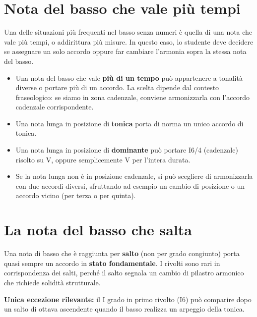\section{Nota del basso che vale più tempi}
\label{sec:nota_piu_tempi}

Una delle situazioni più frequenti nel basso senza numeri è quella di una nota che vale più tempi, o addirittura più misure. In questo caso, lo studente deve decidere se assegnare un solo accordo oppure far cambiare l'armonia sopra la stessa nota del basso.

\begin{regola}
	\label{reg:nota_piu_tempi}
	\begin{itemize}
		\item Una nota del basso che vale \textbf{più di un tempo} può appartenere a tonalità diverse o portare più di un accordo. La scelta dipende dal contesto fraseologico: se siamo in zona cadenzale, conviene armonizzarla con l'accordo cadenzale corrispondente.
		\item Una nota lunga in posizione di \textbf{tonica} porta di norma un unico accordo di tonica.
		\item Una nota lunga in posizione di \textbf{dominante} può portare I6/4 (cadenzale) risolto su V, oppure semplicemente V per l'intera durata.
		\item Se la nota lunga non è in posizione cadenzale, si può scegliere di armonizzarla con due accordi diversi, sfruttando ad esempio un cambio di posizione o un accordo vicino (per terza o per quinta).
	\end{itemize}
\end{regola}

\section{La nota del basso che salta}
\label{sec:nota_salta}

\begin{regola}
	\label{reg:nota_salta_stati_fondamentali}
	Una nota di basso che è raggiunta per \textbf{salto} (non per grado congiunto) porta quasi sempre un accordo in \textbf{stato fondamentale}. I rivolti sono rari in corrispondenza dei salti, perché il salto segnala un cambio di pilastro armonico che richiede solidità strutturale.
	
	\textbf{Unica eccezione rilevante:} il I grado in primo rivolto (I6) può comparire dopo un salto di ottava ascendente quando il basso realizza un arpeggio della tonica.
\end{regola}

